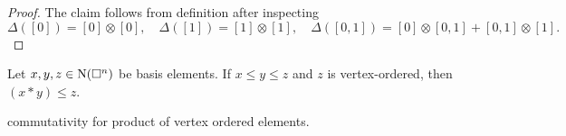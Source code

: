 \begin{proof}
	The claim follows from definition after inspecting
	\begin{equation*}
	\Delta([0]) = [0] \otimes [0], \quad \Delta([1]) = [1] \otimes [1], \quad \Delta([0, 1]) = [0] \otimes [0, 1] + [0, 1] \otimes [1].
	\end{equation*}
\end{proof}

\begin{lemma}
	Let $x,y,z \in \operatorname{N}(\square^n)$ be basis elements. If $x \leq y \leq z$ and $z$ is vertex-ordered, then $(x \ast y) \leq z$.
\end{lemma}

\begin{lemma}
	commutativity for product of vertex ordered elements.
\end{lemma}










%	
